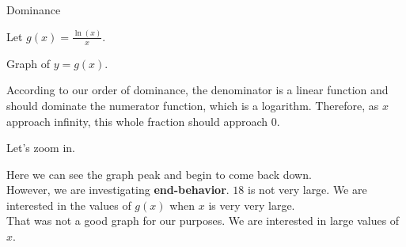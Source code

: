 \documentclass{ximera}
\begin{document}
\begin{example} Dominance


Let $g(x) = \frac{\ln(x)}{x}$.

Graph of $y = g(x)$.


According to our order of dominance, the denominator is a linear function and should dominate the numerator function, which is a logarithm.  Therefore, as $x$ approach infinity, this whole fraction should approach $0$.


\begin{image}
\end{image}



Let's zoom in.


\begin{center}
\end{center}



Here we can see the graph peak and begin to come back down.   \\


However, we are investigating \textbf{end-behavior}.  $18$ is not very large. We are interested in the values of $g(x)$ when $x$ is very very large. \\  

That was not a good graph for our purposes.  We are interested in large values of $x$.










\end{example}
\end{document}
